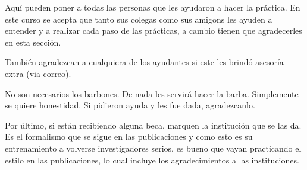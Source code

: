 \documentclass[pre,amsmath,amssymb, twocolumn, showpacs]{revtex4}
\begin{document}
Aquí pueden poner a todas las personas que les ayudaron a hacer la práctica. En este curso se acepta que tanto sus colegas como sus amigons les ayuden a entender y a realizar cada paso de las prácticas, a cambio tienen que agradecerles en esta sección.

También agradezcan a cualquiera de los ayudantes si este les brindó asesoría extra (via correo). 

No son necesarios los barbones. De nada les servirá hacer la barba. Simplemente se quiere honestidad. Si pidieron ayuda y les fue dada, agradezcanlo. 

Por último, si están recibiendo alguna beca, marquen la institución que se las da. Es el formalismo que se sigue en las publicaciones y como esto es su entrenamiento a volverse investigadores serios, es bueno que vayan practicando el estilo en las publicaciones, lo cual incluye los agradecimientos a las instituciones. 



\end{document}
